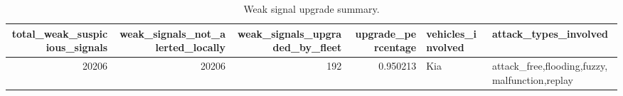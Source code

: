 \begin{table}[t]
\centering
\begin{tabular}{rrrrll}
\toprule
total\_weak\_suspicious\_signals & weak\_signals\_not\_alerted\_locally & weak\_signals\_upgraded\_by\_fleet & upgrade\_percentage & vehicles\_involved & attack\_types\_involved \\
\midrule
20206 & 20206 & 192 & 0.950213 & Kia & attack\_free,flooding,fuzzy,malfunction,replay \\
\bottomrule
\end{tabular}
\caption{Weak signal upgrade summary.}
\label{tab:weak-upgrade}
\end{table}
